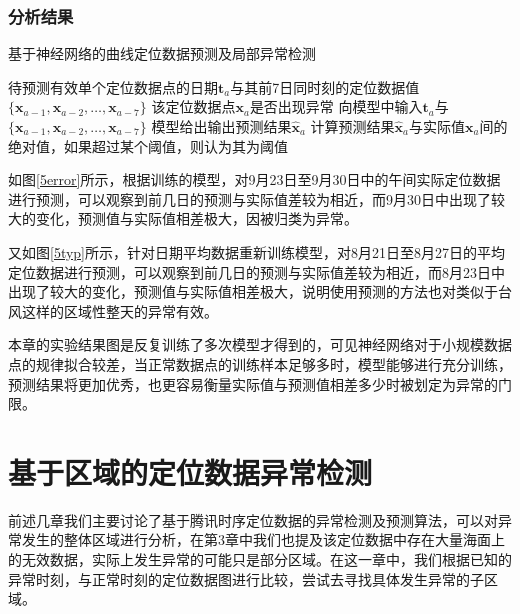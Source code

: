 \documentclass[a4paper,AutoFakeBold,oneside,12pt]{book}
\begin{document}

\subsection{分析结果}

\begin{algorithm} 
\caption{基于神经网络的曲线定位数据预测及局部异常检测} 
\label{a42}
\renewcommand{\algorithmicrequire}{\textbf{输入：}}
\renewcommand{\algorithmicensure}{\textbf{输出：}} 
\begin{algorithmic}[1] 
\Require 待预测有效单个定位数据点的日期$\bm{t}_a$与其前7日同时刻的定位数据值$\{\bm{x}_{a-1},\bm{x}_{a-2},\ldots,\bm{x}_{a-7}\}$
\Ensure 该定位数据点$\bm{x}_a$是否出现异常
\State  向模型中输入$\bm{t}_a$与$\{\bm{x}_{a-1},\bm{x}_{a-2},\ldots,\bm{x}_{a-7}\}$
\State 模型给出输出预测结果$\bm{\hat{x}}_a$
\State 计算预测结果$\bm{\hat{x}}_a$与实际值$\bm{x}_a$间的绝对值，如果超过某个阈值，则认为其为阈值
\end{algorithmic}  
\end{algorithm}

	如图\ref{5error}所示，根据训练的模型，对9月23日至9月30日中的午间实际定位数据进行预测，可以观察到前几日的预测与实际值差较为相近，而9月30日中出现了较大的变化，预测值与实际值相差极大，因被归类为异常。


	又如图\ref{5typ}所示，针对日期平均数据重新训练模型，对8月21日至8月27日的平均定位数据进行预测，可以观察到前几日的预测与实际值差较为相近，而8月23日中出现了较大的变化，预测值与实际值相差极大，说明使用预测的方法也对类似于台风这样的区域性整天的异常有效。


	本章的实验结果图是反复训练了多次模型才得到的，可见神经网络对于小规模数据点的规律拟合较差，当正常数据点的训练样本足够多时，模型能够进行充分训练，预测结果将更加优秀，也更容易衡量实际值与预测值相差多少时被划定为异常的门限。

\chapter{基于区域的定位数据异常检测}
	前述几章我们主要讨论了基于腾讯时序定位数据的异常检测及预测算法，可以对异常发生的整体区域进行分析，在第3章中我们也提及该定位数据中存在大量海面上的无效数据，实际上发生异常的可能只是部分区域。在这一章中，我们根据已知的异常时刻，与正常时刻的定位数据图进行比较，尝试去寻找具体发生异常的子区域。
\end{document}
